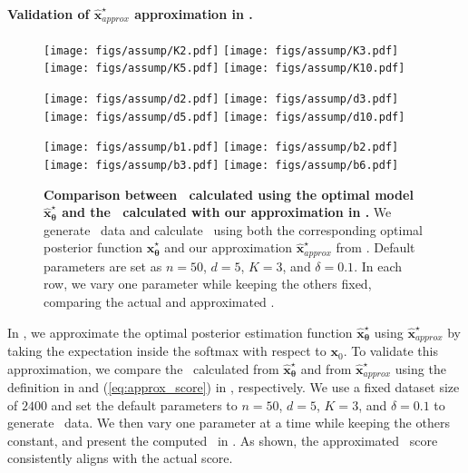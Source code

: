 \paragraph{Validation of $\hat{\bm x}_{\textit{approx}}^{\star}$ approximation in .}
\begin{figure}[t]
    \centering
    \texttt{[image: figs/assump/K2.pdf]}
    \texttt{[image: figs/assump/K3.pdf]}
    \texttt{[image: figs/assump/K5.pdf]}
    \texttt{[image: figs/assump/K10.pdf]}

    \texttt{[image: figs/assump/d2.pdf]}
    \texttt{[image: figs/assump/d3.pdf]}
    \texttt{[image: figs/assump/d5.pdf]}
    \texttt{[image: figs/assump/d10.pdf]}

    \texttt{[image: figs/assump/b1.pdf]}
    \texttt{[image: figs/assump/b2.pdf]}
    \texttt{[image: figs/assump/b3.pdf]}
    \texttt{[image: figs/assump/b6.pdf]}
    \caption{\textbf{Comparison between \CSNR~calculated using the optimal model $\hat{\bm x}_{\bm \theta}^{\star}$ and the \CSNR~calculated with our approximation in .} We generate \MoLRG~data and calculate \CSNR~using both the corresponding optimal posterior function $\hat{\bm x}_{\bm \theta}^{\star}$ and our approximation $\hat{\bm x}_{\textit{approx}}^{\star}$ from . Default parameters are set as $n=50$, $d=5$, $K=3$, and $\delta=0.1$. In each row, we vary one parameter while keeping the others fixed, comparing the actual and approximated \CSNR.}
    \label{fig:assump_validate}
\end{figure}

In , we approximate the optimal posterior estimation function $\hat{\bm x}_{\bm \theta}^{\star}$ using $\hat{\bm x}_{\textit{approx}}^{\star}$ by taking the expectation inside the softmax with respect to $\bm x_0$. To validate this approximation, we compare the \CSNR~calculated from $\hat{\bm x}_{\bm \theta}^{\star}$ and from $\hat{\bm x}_{\textit{approx}}^{\star}$ using the definition in  and (\ref{eq:approx_score}) in , respectively. We use a fixed dataset size of $2400$ and set the default parameters to $n=50$, $d=5$, $K=3$, and $\delta=0.1$ to generate \MoLRG~data. We then vary one parameter at a time while keeping the others constant, and present the computed \CSNR~in . As shown, the approximated \CSNR~score consistently aligns with the actual score.

